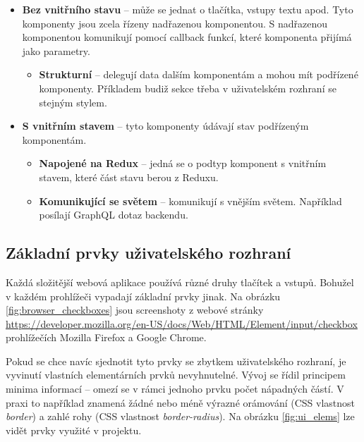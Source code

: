 \begin{itemize}
  \setlength\itemsep{0.05em}
  \item \textbf{Bez vnitřního stavu} -- může se jednat o tlačítka, vstupy textu apod. Tyto komponenty jsou zcela řízeny
      nadřazenou komponentou. S nadřazenou komponentou komunikují pomocí callback funkcí, které komponenta přijímá jako parametry.
  \begin{itemize}
    \setlength\itemsep{0.05em}
    \item \textbf{Strukturní} -- delegují data dalším komponentám a mohou mít podřízené komponenty. Příkladem budiž sekce třeba v 
        uživatelském rozhraní se stejným stylem.
  \end{itemize}
  \item \textbf{S vnitřním stavem} -- tyto komponenty údávají stav podřízeným komponentám.
  \begin{itemize}
    \setlength\itemsep{0.05em}
    \item \textbf{Napojené na Redux} -- jedná se o podtyp komponent s vnitřním stavem, které část stavu berou z Reduxu.
    \item \textbf{Komunikující se světem} --  komunikují s vnějším světem. Například posílají GraphQL dotaz backendu.
  \end{itemize}
\end{itemize}

\subsection{Základní prvky uživatelského rozhraní}

\noindent
Každá složitější webová aplikace používá různé druhy tlačítek a vstupů.
Bohužel v každém prohlížeči vypadají základní prvky jinak. Na obrázku \ref{fig:browser_checkboxes}
jsou screenshoty z webové stránky \url{https://developer.mozilla.org/en-US/docs/Web/HTML/Element/input/checkbox}
prohlížečích Mozilla Firefox a Google Chrome.

Pokud se chce navíc sjednotit tyto prvky se zbytkem uživatelského rozhraní, je
vyvinutí vlastních elementárních prvků nevyhnutelné. Vývoj se řídil principem minima informací
-- omezí se v rámci jednoho prvku počet nápadných částí. V praxi to například znamená žádné nebo méně výrazné
 orámování (CSS vlastnost \textit{border}) a zahlé rohy (CSS vlastnost \textit{border-radius}).
Na obrázku \ref{fig:ui_elems} lze vidět prvky využité v projektu.

